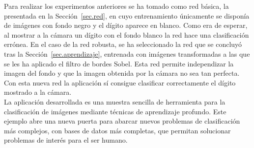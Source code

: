 Para realizar los experimentos anteriores se ha tomado como red básica, la presentada en la Sección~\ref{sec.red}, en cuyo entrenamiento únicamente se disponía de imágenes con fondo negro y el dígito aparece en blanco. Como era de esperar, al mostrar a la cámara un dígito con el fondo blanco la red hace una clasificación errónea. En el caso de la red robusta, se ha seleccionado la red que se concluyó tras la Sección~\ref{sec.aprendizaje}, entrenada con imágenes transformadas a las que se les ha aplicado el filtro de bordes Sobel. Esta red permite independizar la imagen del fondo y que la imagen obtenida por la cámara no sea tan perfecta. Con esta nueva red la aplicación sí consigue clasificar correctamente el dígito mostrado a la cámara.\\

La aplicación desarrollada es una muestra sencilla de herramienta para la clasificación de imágenes mediante técnicas de aprendizaje profundo. Este ejemplo abre una nueva puerta para abarcar nuevos problemas de clasificación más complejos, con bases de datos más completas, que permitan solucionar problemas de interés para el ser humano.
